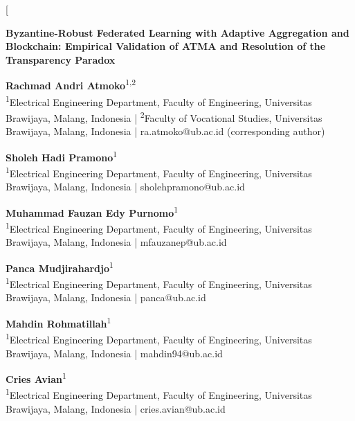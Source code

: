 \documentclass[10pt,letterpaper]{article}
\begin{document}
\normalsize
\newpage
\twocolumn[
\begin{minipage}{\textwidth}
\raggedright
{\Large\bfseries Byzantine-Robust Federated Learning with Adaptive Aggregation
and Blockchain: Empirical Validation of ATMA and Resolution of the Transparency
Paradox\par}
\vspace{0.5em}
\textbf{Rachmad Andri Atmoko}\textsuperscript{1,2}\\
\textsuperscript{1}Electrical Engineering Department, Faculty of Engineering,
Universitas Brawijaya, Malang, Indonesia |
\textsuperscript{2}Faculty of Vocational Studies, Universitas Brawijaya,
Malang, Indonesia |
ra.atmoko@ub.ac.id (corresponding author)\par
\textbf{Sholeh Hadi Pramono}\textsuperscript{1}\\
\textsuperscript{1}Electrical Engineering Department, Faculty of Engineering,
Universitas Brawijaya,
Malang, Indonesia |
sholehpramono@ub.ac.id\par
\textbf{Muhammad Fauzan Edy Purnomo}\textsuperscript{1}\\
\textsuperscript{1}Electrical Engineering Department, Faculty of Engineering,
Universitas Brawijaya,
Malang, Indonesia |
mfauzanep@ub.ac.id\par
\textbf{Panca Mudjirahardjo}\textsuperscript{1}\\
\textsuperscript{1}Electrical Engineering Department, Faculty of Engineering,
Universitas Brawijaya,
Malang, Indonesia |
panca@ub.ac.id\par
\textbf{Mahdin Rohmatillah}\textsuperscript{1}\\
\textsuperscript{1}Electrical Engineering Department, Faculty of Engineering,
Universitas Brawijaya,
Malang, Indonesia |
mahdin94@ub.ac.id\par
\textbf{Cries Avian}\textsuperscript{1}\\
\textsuperscript{1}Electrical Engineering Department, Faculty of Engineering,
Universitas Brawijaya,
Malang, Indonesia |
cries.avian@ub.ac.id
\end{minipage}
\end{document}
